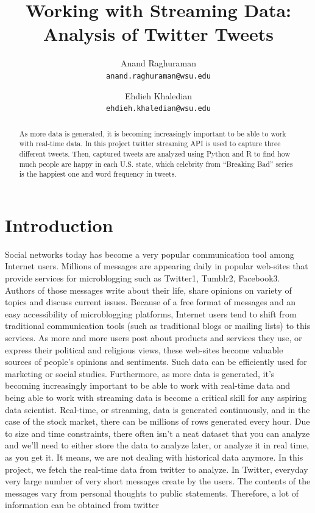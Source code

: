\documentclass[11pt,english]{article}
\title{Working with Streaming Data:\\Analysis of Twitter Tweets}
\author{
	Anand Raghuraman\\
	\texttt{anand.raghuraman@wsu.edu}
	\and
	Ehdieh Khaledian\\
	\texttt{ehdieh.khaledian@wsu.edu}
}
\begin{document}
	
\maketitle{}

\begin{abstract}
As more data is generated, it is becoming increasingly important to be able to work with real-time
data. In this project twitter streaming API is used to capture three different tweets. Then, captured
tweets are analyzed using Python and R to find how much people are happy in each U.S. state,
which celebrity from “Breaking Bad” series is the happiest one and word frequency in tweets.
\end{abstract}

\section{Introduction}
Social networks today has become a very popular communication tool among Internet users.
Millions of messages are appearing daily in popular web-sites that provide services for
microblogging such as Twitter1, Tumblr2, Facebook3. Authors of those messages write about their
life, share opinions on variety of topics and discuss current issues. Because of a free format of
messages and an easy accessibility of microblogging platforms, Internet users tend to shift from
traditional communication tools (such as traditional blogs or mailing lists) to this services. As more
and more users post about products and services they use, or express their political and religious
views, these web-sites become valuable sources of people’s opinions and sentiments. Such data
can be efficiently used for marketing or social studies.
Furthermore, as more data is generated, it’s becoming increasingly important to be able to work
with real-time data and being able to work with streaming data is become a critical skill for any
aspiring data scientist. Real-time, or streaming, data is generated continuously, and in the case of
the stock market, there can be millions of rows generated every hour. Due to size and time
constraints, there often isn’t a neat dataset that you can analyze and we’ll need to either store the
data to analyze later, or analyze it in real time, as you get it. It means, we are not dealing with
historical data anymore.
In this project, we fetch the real-time data from twitter to analyze. In Twitter, everyday very large
number of very short messages create by the users. The contents of the messages vary from 
personal thoughts to public statements. Therefore, a lot of information can be obtained from twitter
\end{document}
